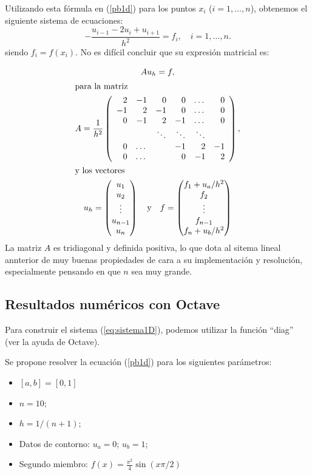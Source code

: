 \documentclass[11pt,spanish]{article}
\begin{document}
Utilizando esta fórmula en (\ref{pb1d}) para los puntos $x_i$
($i=1,\dots,n$), obtenemos el siguiente sistema de ecuaciones:
$$
-\frac{u_{i-1}-2u_i + u_{i+1}}{h^2} = f_i, \quad i=1,\dots,n.
$$
siendo $f_i=f(x_i)$.
No es difícil concluir que su expresión matricial es:

\begin{gather}
Au_h=f,\label{eq:sistema1D} \\
\intertext{para la matriz}
A=\frac{1}{h^2}\left(
\begin{array}{rrrrrr}
   2 & -1 &  0 &  0 & \dots & 0 \\
  -1 &  2 & -1 &  0 & \dots & 0 \\
   0 & -1 &  2 & -1 & \dots & 0 \\
     &    & \ddots & \ddots & \ddots \\
   0 & \dots & & -1 & 2  & -1 \\
   0 & \dots & & 0 & -1 & 2
 \end{array}
\right),
\\
\intertext{y los vectores}
u_h=
\begin{pmatrix}
  u_1 \\ u_2 \\ \vdots \\ u_{n-1} \\ u_n
\end{pmatrix}
%
\quad \mbox{y}  \quad
f=
\begin{pmatrix}
  f_1 + u_a/h^2 \\ f_2 \\ \vdots \\ f_{n-1} \\ f_n+u_b/h^2
\end{pmatrix}
\end{gather}
La matriz $A$ es tridiagonal y definida positiva, lo que dota al
sitema lineal annterior de muy buenas propiedades de cara a su
implementación y resolución, especialmente pensando en que $n$ sea muy
grande.

\subsection{Resultados numéricos con Octave}
Para construir el sistema (\ref{eq:sistema1D}), podemos utilizar la
función ``diag'' (ver la ayuda de Octave).

Se propone resolver la ecuación (\ref{pb1d}) para los siguientes
parámetros:
\begin{itemize}
\item $[a,b]=[0,1]$
\item $n= 10$;
\item $h = 1/(n+1)$;
\item Datos de contorno: $u_a=0$; $u_b=1$;
\item Segundo miembro: $f(x)=\frac{\pi^2}{4}  \sin(x\pi/2)$
\end{itemize}
\end{document}

